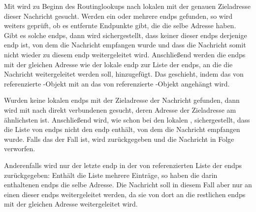 Mit  wird zu Beginn des Routinglookups
nach lokalen  mit der genauen Zieladresse dieser Nachricht gesucht.
Werden ein oder mehrere \glspl{endp} gefunden, so wird weiters geprüft, ob es entfernte Endpunkte
gibt, die die selbe Adresse haben. Gibt es solche \glspl{endp}, dann wird sichergestellt, dass
keiner dieser \glspl{endp} derjenige \gls{endp} ist, von dem die Nachricht empfangen wurde und
dass die Nachricht somit nicht wieder zu diesem \gls{endp} weitergeleitet wird.
Anschließend werden die \glspl{endp} mit der gleichen Adresse wie der lokale \gls{endp} zur Liste
der \glspl{endp}, an die die Nachricht weitergeleitet werden soll, hinzugefügt.
Das geschieht, indem das von  referenzierte -Objekt
mit  an das von  referenzierte
-Objekt angehängt wird.

Wurden keine lokalen \glspl{endp} mit der Zieladresse der Nachricht gefunden, dann wird mit
 nach direkt verbundenen
 gesucht, deren Adresse der Zieladresse am ähnlichsten ist.
Anschließend wird, wie schon bei den lokalen , sichergestellt,
dass die Liste von \glspl{endp} nicht den \gls{endp} enthält, von dem die Nachricht empfangen
wurde.
Falls das der Fall ist, wird  zurückgegeben und die Nachricht in Folge verworfen.

Anderenfalls wird nur der letzte \gls{endp} in der von  referenzierten
Liste der \glspl{endp} zurückgegeben: Enthält die Liste mehrere Einträge, so haben die darin
enthaltenen \glspl{endp} die selbe Adresse. Die Nachricht soll in diesem Fall aber nur an einen
dieser \glspl{endp} weitergeleitet werden, da sie von dort an die restlichen \glspl{endp} mit der
gleichen Adresse weitergeleitet wird.
